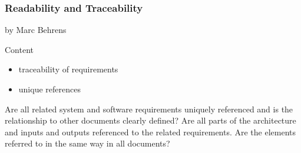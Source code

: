 \subsubsection{Readability and Traceability}

by Marc Behrens

Content
\begin{itemize}
\item traceability of requirements
\item unique references
\end{itemize}


Are all related system and software requirements uniquely referenced and is the relationship to other documents clearly defined?
Are all parts of the architecture and inputs and outputs referenced to the related requirements.
Are the elements referred to in the same way in all documents?


